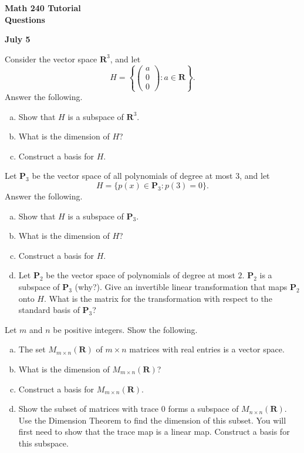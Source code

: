 \documentclass[a4paper,11pt]{article}
\newcommand{\R}{\mathbf{R}}
\newcommand{\PP}{\mathbf{P}}
\begin{document}
\begin{center}
  {\Large\bfseries Math 240 Tutorial \\ Questions}
\end{center}
\begin{center}
  {\bfseries July 5}
\end{center}

 Consider the vector space $\R^3$, and let
\[
  H=\left\{
    \begin{pmatrix}a\\0\\0\end{pmatrix}
    : a \in \R
  \right\}.
\]
Answer the following.
\begin{enumerate}[(a)]
\item Show that $H$ is a subspace of $\R^3$.
\item What is the dimension of $H$?
\item Construct a basis for $H$. \\
\end{enumerate}

 Let $\PP_3$ be the vector space of all polynomials
of degree at most 3, and let
\[
  H = \{p(x) \in \PP_3 : p(3)=0\}.
\]
Answer the following.
\begin{enumerate}[(a)]
\item Show that $H$ is a subspace of $\PP_3$.
\item What is the dimension of $H$?
\item Construct a basis for $H$.
\item Let $\PP_2$ be the vector space of polynomials of degree at most $2$.
  $\PP_2$ is a subspace of $\PP_3$ (why?). Give an invertible linear
  transformation that maps $\PP_2$ onto $H$. What is the matrix for the
  transformation with respect to the standard basis of $\PP_3$? \\
\end{enumerate}

 Let $m$ and $n$ be positive integers. Show the
following.
\begin{enumerate}[(a)]
\item The set $M_{m \times n}(\R)$ of $m \times n$ matrices with real entries is
  a vector space.
\item What is the dimension of $M_{m \times n}(\R)$?
\item Construct a basis for $M_{m \times n}(\R)$.
\item Show the subset of matrices with trace 0 forms a subspace of $M_{n \times
    n}(\R)$. Use the Dimension Theorem to find the dimension of this subset. You
  will first need to show that the trace map is a linear map. Construct a basis
  for this subspace. \\
\end{enumerate}
\end{document}
